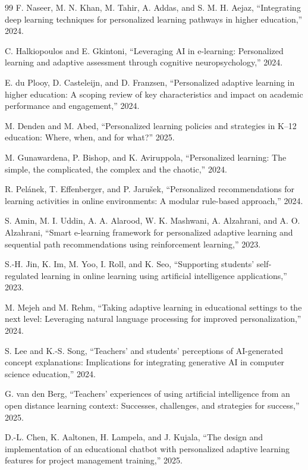 \documentclass[conference]{IEEEtran}
\begin{document}
\begin{thebibliography}{99}
F. Naseer, M. N. Khan, M. Tahir, A. Addas, and S. M. H. Aejaz,
``Integrating deep learning techniques for personalized learning pathways
in higher education,'' 2024.

C. Halkiopoulos and E. Gkintoni,
``Leveraging AI in e-learning: Personalized learning and adaptive
assessment through cognitive neuropsychology,'' 2024.

E. du Plooy, D. Casteleijn, and D. Franzsen,
``Personalized adaptive learning in higher education: A scoping review of
key characteristics and impact on academic performance and engagement,''
2024.

M. Denden and M. Abed,
``Personalized learning policies and strategies in K--12 education:
Where, when, and for what?'' 2025.

M. Gunawardena, P. Bishop, and K. Aviruppola,
``Personalized learning: The simple, the complicated, the complex and
the chaotic,'' 2024.

R. Pelánek, T. Effenberger, and P. Jarušek,
``Personalized recommendations for learning activities in online
environments: A modular rule-based approach,'' 2024.

S. Amin, M. I. Uddin, A. A. Alarood, W. K. Mashwani,
A. Alzahrani, and A. O. Alzahrani,
``Smart e-learning framework for personalized adaptive learning and
sequential path recommendations using reinforcement learning,'' 2023.

S.-H. Jin, K. Im, M. Yoo, I. Roll, and K. Seo,
``Supporting students' self-regulated learning in online learning using
artificial intelligence applications,'' 2023.

M. Mejeh and M. Rehm,
``Taking adaptive learning in educational settings to the next level:
Leveraging natural language processing for improved personalization,''
2024.

S. Lee and K.-S. Song,
``Teachers' and students' perceptions of AI-generated concept explanations:
Implications for integrating generative AI in computer science education,''
2024.

G. van den Berg,
``Teachers' experiences of using artificial intelligence from an open
distance learning context: Successes, challenges, and strategies for
success,'' 2025.

D.-L. Chen, K. Aaltonen, H. Lampela, and J. Kujala,
``The design and implementation of an educational chatbot with personalized
adaptive learning features for project management training,'' 2025.


\end{thebibliography}
\end{document}
